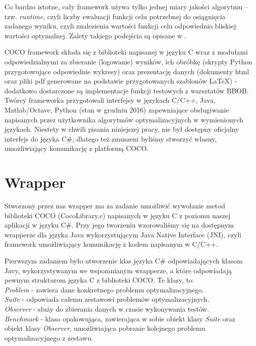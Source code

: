 \documentclass[12pt, twoside, openany, abstract=on]{report}
\theoremstyle{definition}
\begin{document}
Co bardzo istotne, cały framework używa tylko jednej miary jakości algorytmu – tzw. \textit{runtime}, czyli liczby ewaluacji funkcji celu potrzebnej do osiągnięcia zadanego wyniku, czyli znalezienia wartości funkcji celu odpowiednio bliskiej wartości optymalnej. Zalety takiego podejścia są opisane w \cite{CocoPlatform}.

COCO framework składa się z biblioteki napisanej w języku C wraz z modułami odpowiedzialnymi za zbieranie (logowanie) wyników, ich obróbkę (skrypty Python przygotowujące odpowiednie wykresy) oraz prezentację danych (dokumenty html oraz pliki pdf generowane na podstawie przygotowanych szablonów LaTeX) - dodatkowo dostarczone są implementacje funkcji testowych z warsztatów BBOB. Twórcy frameworka przygotowali interfejsy w językach C/C++, Java, Matlab/Octave, Python (stan w grudniu 2016) zapewniające obsługiwanie napisanych przez użytkownika algorytmów optymalizacyjnych w wymienionych językach. Niestety w chwili pisania niniejszej pracy, nie był dostępny oficjalny interfejs do języka C\#, dlatego też zmuszeni byliśmy stworzyć własny, umożliwiający komunikację z platformą COCO.

\section{Wrapper}

Stworzony przez nas wrapper ma za zadanie umożliwić wywołanie metod biblioteki COCO (CocoLibrary.c) napisanych w języku C z poziomu naszej aplikacji w języku C\#. Przy jego tworzeniu wzorowaliśmy się na dostępnym wrapperze dla języka Java wykorzystującym Java Native Interface (JNI), czyli framework umożliwiający komunikację z kodem napisanym w C/C++. 

Pierwszym zadaniem było utworzenie klas języka C\# odpowiadających klasom Javy, wykorzystywanym we wspomnianym wrapperze, a które odpowiadają pewnym strukturom języka C z biblioteki COCO. Te klasy, to:\\

\textit{Problem} - zawiera dane konkretnego problemu optymalizacyjnego.\\
\textit{Suite} - odpowiada całemu zestawowi problemów optymalizacyjnych.\\
\textit{Observer} - służy do zbierania danych w czasie wykonywania testów.\\
\textit{Benchmark} - klasa opakowująca, zawierająca w sobie obiekt klasy \textit{Suite} oraz obiekt klasy \textit{Observer}, umożliwiająca pobranie kolejnego problemu optymalizacyjnego z zestawu.\\
\end{document}
